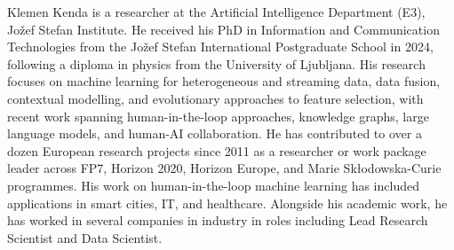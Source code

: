 \begin{IEEEbiography}{Klemen Kenda} is a researcher at the Artificial
Intelligence Department (E3), Jožef Stefan Institute. He received his PhD in Information and
Communication Technologies from the Jožef
Stefan International Postgraduate School in 2024,
following a diploma in physics from the University
of Ljubljana. His research focuses on machine
learning for heterogeneous and streaming data,
data fusion, contextual modelling, and evolutionary
approaches to feature selection, with recent work
spanning human-in-the-loop approaches,
knowledge graphs, large language models, and
human-AI collaboration. He has contributed to
over a dozen European research projects since
2011 as a researcher or work package leader
across FP7, Horizon 2020, Horizon Europe, and
Marie Skłodowska-Curie programmes. His work on
human-in-the-loop machine learning has included
applications in smart cities, IT, and healthcare.
Alongside his academic work, he has worked in
several companies in industry in roles including
Lead Research Scientist and Data Scientist.
\end{IEEEbiography}



\EOD


